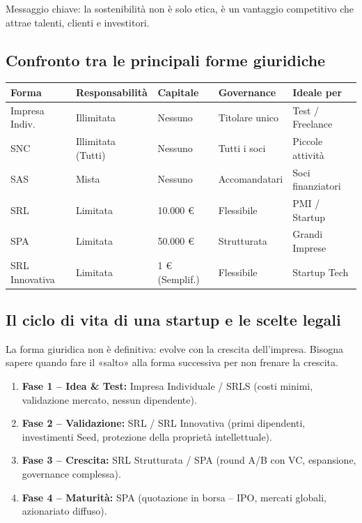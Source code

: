 \documentclass[a4paper,12pt]{article}
\begin{document}
	Messaggio chiave: la sostenibilità non è solo etica, è un vantaggio competitivo che attrae talenti, clienti e investitori.
	
	\subsection{Confronto tra le principali forme giuridiche}
	
	\begin{table}[h]
		\centering
		\small
		\begin{tabular}{|l|l|l|l|l|}
			\hline
			\textbf{Forma} & \textbf{Responsabilità} & \textbf{Capitale} & \textbf{Governance} & \textbf{Ideale per} \\
			\hline
			Impresa Indiv. & Illimitata & Nessuno & Titolare unico & Test / Freelance \\
			\hline
			SNC & Illimitata (Tutti) & Nessuno & Tutti i soci & Piccole attività \\
			\hline
			SAS & Mista & Nessuno & Accomandatari & Soci finanziatori \\
			\hline
			SRL & Limitata & 10.000 € & Flessibile & PMI / Startup \\
			\hline
			SPA & Limitata & 50.000 € & Strutturata & Grandi Imprese \\
			\hline
			SRL Innovativa & Limitata & 1 € (Semplif.) & Flessibile & Startup Tech \\
			\hline
		\end{tabular}
	\end{table}
	
	\subsection{Il ciclo di vita di una startup e le scelte legali}
	
	La forma giuridica non è definitiva: evolve con la crescita dell'impresa.%
	Bisogna sapere quando fare il «salto» alla forma successiva per non frenare la crescita.
	
	\begin{enumerate}
		\item \textbf{Fase 1 -- Idea \& Test:} Impresa Individuale / SRLS (costi minimi, validazione mercato, nessun dipendente).
		\item \textbf{Fase 2 -- Validazione:} SRL / SRL Innovativa (primi dipendenti, investimenti Seed, protezione della proprietà intellettuale).
		\item \textbf{Fase 3 -- Crescita:} SRL Strutturata / SPA (round A/B con VC, espansione, governance complessa).
		\item \textbf{Fase 4 -- Maturità:} SPA (quotazione in borsa -- IPO, mercati globali, azionariato diffuso).
	\end{enumerate}
	
\end{document}
